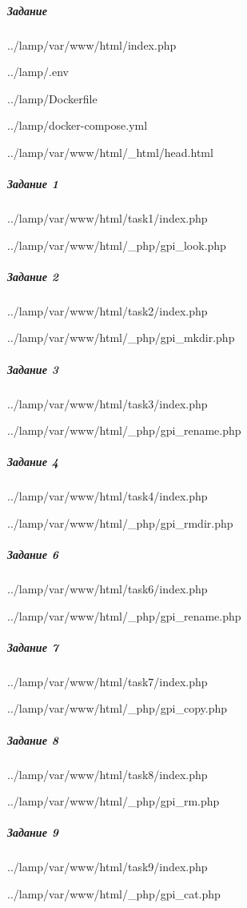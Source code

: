 \subparagraph{Задание} \hspace{0pt}


{../lamp/var/www/html/index.php}


{../lamp/.env}


{../lamp/Dockerfile}


{../lamp/docker-compose.yml}


{../lamp/var/www/html/_html/head.html}

\subparagraph{Задание 1} \hspace{0pt}


{../lamp/var/www/html/task1/index.php}


{../lamp/var/www/html/_php/gpi_look.php}

\subparagraph{Задание 2} \hspace{0pt}


{../lamp/var/www/html/task2/index.php}


{../lamp/var/www/html/_php/gpi_mkdir.php}

\subparagraph{Задание 3} \hspace{0pt}


{../lamp/var/www/html/task3/index.php}


{../lamp/var/www/html/_php/gpi_rename.php}

\subparagraph{Задание 4} \hspace{0pt}


{../lamp/var/www/html/task4/index.php}


{../lamp/var/www/html/_php/gpi_rmdir.php}

\subparagraph{Задание 6} \hspace{0pt}


{../lamp/var/www/html/task6/index.php}


{../lamp/var/www/html/_php/gpi_rename.php}

\subparagraph{Задание 7} \hspace{0pt}


{../lamp/var/www/html/task7/index.php}


{../lamp/var/www/html/_php/gpi_copy.php}

\subparagraph{Задание 8} \hspace{0pt}


{../lamp/var/www/html/task8/index.php}


{../lamp/var/www/html/_php/gpi_rm.php}

\subparagraph{Задание 9} \hspace{0pt}


{../lamp/var/www/html/task9/index.php}


{../lamp/var/www/html/_php/gpi_cat.php}
